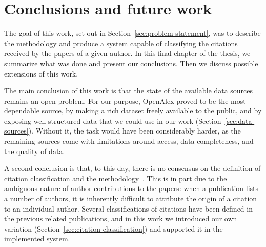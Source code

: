 
\chapter{Conclusions and future work} \label{c6:conclusions}


%

The goal of this work, set out in Section~\ref{sec:problem-statement}, was to describe the methodology and produce a system capable of classifying the citations received by the papers of a given author.
In this final chapter of the thesis, we summarize what was done and present our conclusions.
Then we discuss possible extensions of this work.


The main conclusion of this work is that the state of the available data sources remains an open problem.
For our purpose, \textsf{OpenAlex} proved to be the most dependable source, by making a rich dataset freely available to the public, and by exposing well-structured data that we could use in our work (Section~\ref{sec:data-sources}).
Without it, the task would have been considerably harder, as the remaining sources come with limitations around access, data completeness, and the quality of data.

A second conclusion is that, to this day, there is no consensus on the definition of citation classification and the methodology~\cite{Glnzel2003BIBLIOMETRICSAA, Costas2010}.
This is in part due to the ambiguous nature of author contributions to the papers: when a publication lists a number of authors, it is inherently difficult to attribute the origin of a citation to an individual author.
Several classifications of citations have been defined in the previous related publications, and in this work we introduced our own variation (Section~\ref{sec:citation-classification}) and supported it in the implemented system.

